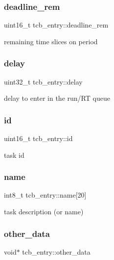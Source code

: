 \subsubsection{\texorpdfstring{deadline\+\_\+rem}{deadline\_rem}}
{\footnotesize\ttfamily uint16\+\_\+t tcb\+\_\+entry\+::deadline\+\_\+rem}

remaining time slices on period \mbox{\label{structtcb__entry_ab29fad6168f140493ddc8f860fadc3bc}} 
\subsubsection{\texorpdfstring{delay}{delay}}
{\footnotesize\ttfamily uint32\+\_\+t tcb\+\_\+entry\+::delay}

delay to enter in the run/\+RT queue \mbox{\label{structtcb__entry_ac06c8d6513b9d3031956b0efc2ab4871}} 
\subsubsection{\texorpdfstring{id}{id}}
{\footnotesize\ttfamily uint16\+\_\+t tcb\+\_\+entry\+::id}

task id \mbox{\label{structtcb__entry_ad7bfcb0f4b58b797af44f3a078abebff}} 
\subsubsection{\texorpdfstring{name}{name}}
{\footnotesize\ttfamily int8\+\_\+t tcb\+\_\+entry\+::name\mbox{[}20\mbox{]}}

task description (or name) \mbox{\label{structtcb__entry_accd675f017bb0ec5ae63b4d729bd73aa}} 
\subsubsection{\texorpdfstring{other\+\_\+data}{other\_data}}
{\footnotesize\ttfamily void$\ast$ tcb\+\_\+entry\+::other\+\_\+data}

